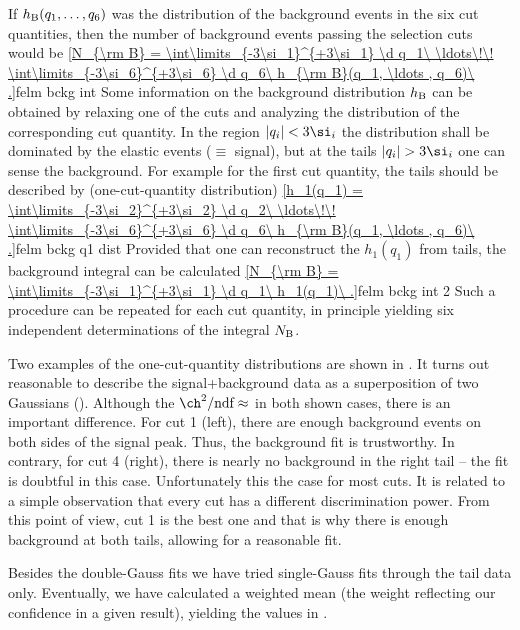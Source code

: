 If $h_{\rm B}(q_1, \ldots , q_6)$ was the distribution of the background events in the six cut quantities, then the number of background events passing the selection cuts would be
\eqref{N_{\rm B} = \int\limits_{-3\si_1}^{+3\si_1} \d q_1\ \ldots\!\! \int\limits_{-3\si_6}^{+3\si_6} \d q_6\  h_{\rm B}(q_1, \ldots , q_6)\ .}{felm bckg int}
Some information on the background distribution $h_{\rm B}$ can be obtained by relaxing one of the cuts and analyzing the distribution of the corresponding cut quantity. In the region $|q_i| < 3\si_i$ the distribution shall be dominated by the elastic events ($\equiv$ signal), but at the tails $|q_i|>3\si_i$ one can sense the background. For example for the first cut quantity, the tails should be described by (one-cut-quantity distribution)
\eqref{h_1(q_1) = \int\limits_{-3\si_2}^{+3\si_2} \d q_2\ \ldots\!\! \int\limits_{-3\si_6}^{+3\si_6} \d q_6\  h_{\rm B}(q_1, \ldots , q_6)\ .}{felm bckg q1 dist}
Provided that one can reconstruct the $h_1(q_1)$ from tails, the background integral can be calculated
\eqref{N_{\rm B} = \int\limits_{-3\si_1}^{+3\si_1} \d q_1\ h_1(q_1)\ .}{felm bckg int 2}
Such a procedure can be repeated for each cut quantity, in principle yielding six independent determinations of the integral $N_{\rm B}$.


Two examples of the one-cut-quantity distributions are shown in . It turns out reasonable to describe the signal+background data as a superposition of two Gaussians (). Although the $\ch^2/\hbox{ndf} \approx$ in both shown cases, there is an important difference. For cut 1 (left), there are enough background events on both sides of the signal peak. Thus, the background fit is trustworthy. In contrary, for cut 4 (right), there is nearly no background in the right tail -- the fit is doubtful in this case. Unfortunately this the case for most cuts. It is related to a simple observation that every cut has a different discrimination power. From this point of view, cut 1 is the best one and that is why there is enough background at both tails, allowing for a reasonable fit.

Besides the double-Gauss fits we have tried single-Gauss fits through the tail data only. Eventually, we have calculated a weighted mean (the weight reflecting our confidence in a given result), yielding the values in .

